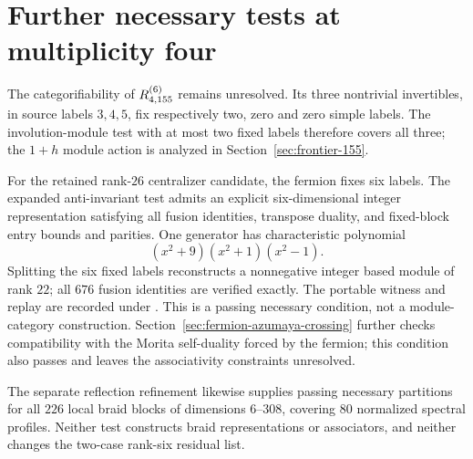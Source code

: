 \section{Further necessary tests at multiplicity four}
\label{sec:155-final-necessary-tests}
The categorifiability of $R^{(6)}_{4,155}$ remains unresolved.  Its three
nontrivial invertibles, in source labels $3,4,5$, fix respectively two,
zero and zero simple labels.  The involution-module test with at most
two fixed labels therefore covers all three; the $1+h$ module action
is analyzed in
Section~\ref{sec:frontier-155}.

For the retained rank-$26$ centralizer candidate, the fermion fixes
six labels.  The expanded anti-invariant test admits an explicit
six-dimensional integer representation satisfying all fusion identities,
transpose duality, and fixed-block entry bounds and parities.  One
generator has characteristic polynomial
\[
 (x^2+9)(x^2+1)(x^2-1).
\]
Splitting the six fixed labels reconstructs a nonnegative integer based
module of rank $22$; all $676$ fusion identities are verified exactly.
The portable witness and replay are recorded under
.
This is a passing necessary condition, not a module-category construction.
Section~\ref{sec:fermion-azumaya-crossing} further checks compatibility
with the Morita self-duality forced by the fermion; this condition also
passes and leaves the associativity constraints unresolved.

The separate reflection refinement likewise supplies passing necessary
partitions for all $226$ local braid blocks of dimensions $6$--$308$,
covering $80$ normalized spectral profiles.  Neither test constructs
braid representations or associators, and neither changes the two-case
rank-six residual list.
